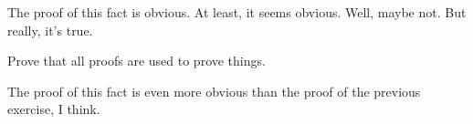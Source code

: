 \documentclass[11pt, twoside, reqno]{article}
\begin{document}

\startmain


\demo
The proof of this fact is obvious.  At least, it seems obvious.  Well, maybe not.  But really, it's true.
\edemo


Prove that all proofs are used to prove things.
\eexero

\demo
The proof of this fact is even more obvious than the proof of the previous exercise, I think.
\edemo
\end{document}
